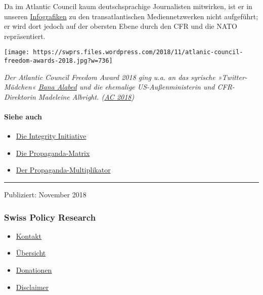 Da im Atlantic Council kaum deutschsprachige Journalisten mitwirken, ist
er in unseren
\href{https://swprs.org/netzwerk-medien-deutschland/}{Infografiken} zu
den transatlantischen Mediennetzwerken nicht aufgeführt; er wird dort
jedoch auf der obersten Ebene durch den CFR und die NATO repräsentiert.

\texttt{[image: https://swprs.files.wordpress.com/2018/11/atlanic-council-freedom-awards-2018.jpg?w=736]}

\emph{Der Atlantic Council Freedom Award 2018 ging u.a. an das syrische
»Twitter-Mädchen«
\href{http://blauerbote.com/2017/07/12/bana-alabed-das-syrische-twittermaedchen/}{Bana
Alabed} und die ehemalige US-Außenministerin und CFR-Direktorin
Madeleine Albright.
(\href{http://www.atlanticcouncil.org/events/freedom-awards/2018-honorees}{AC
2018})}

\hypertarget{siehe-auch}{%
\paragraph{Siehe auch}\label{siehe-auch}}

\begin{itemize}
\tightlist
\item
  \href{https://swprs.org/die-integrity-initiative/}{Die Integrity
  Initiative}
\item
  \href{https://swprs.org/die-propaganda-matrix/}{Die Propaganda-Matrix}
\item
  \href{https://swprs.org/der-propaganda-multiplikator/}{Der
  Propaganda-Multiplikator}
\end{itemize}

\begin{center}\rule{0.5\linewidth}{\linethickness}\end{center}

Publiziert: November 2018

\hypertarget{swiss-policy-research}{%
\subsubsection{Swiss Policy Research}\label{swiss-policy-research}}

\begin{itemize}
\tightlist
\item
  \href{https://swprs.org/kontakt/}{Kontakt}
\item
  \href{https://swprs.org/uebersicht/}{Übersicht}
\item
  \href{https://swprs.org/donationen/}{Donationen}
\item
  \href{https://swprs.org/disclaimer/}{Disclaimer}
\end{itemize}

